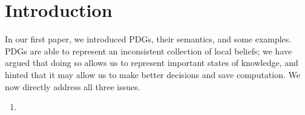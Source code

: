 \documentclass{article}
\theoremstyle{plain}
\theoremstyle{definition}
\theoremstyle{remark}
\begin{document}
\section{Introduction}
In our first paper, we introduced PDGs, their semantics, and some examples. 
PDGs are able to represent an inconsistent collection of local beliefs; we have argued that doing so allows us to represent important states of knowledge, and hinted that it may allow us to make better decisions and save computation. We now directly address all three issues.

\begin{enumerate}
	\item 
\end{enumerate}

\end{document}
